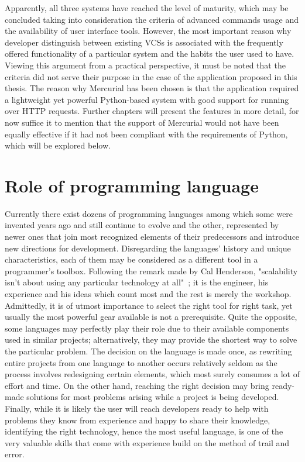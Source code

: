 Apparently, all three systems have reached the level of maturity, which may be concluded taking into consideration the criteria of advanced commands usage and the availability of user interface tools. However, the most important reason why developer distinguish between existing VCSs is associated with the frequently offered functionality of a particular system and the habits the user used to have. Viewing this argument from a practical perspective, it must be noted that the criteria did not serve their purpose in the case of the application proposed in this thesis. The reason why Mercurial has been chosen is that the application required a lightweight yet powerful Python-based system with good support for running over HTTP requests. Further chapters will present the features in more detail, for now suffice it to mention that the support of Mercurial would not have been equally effective if it had not been compliant with the requirements of Python, which will be explored below.

\section{Role of programming language}\label{sec:languages}
Currently there exist dozens of programming languages among which some were invented years ago and still continue to evolve and the other, represented by newer ones that join most recognized elements of their predecessors and introduce new directions for development. Disregarding the languages' history and unique characteristics, each of them may be considered as a different tool in a programmer's toolbox. Following the remark made by Cal Henderson, "scalability isn't about using any particular technology at all"~\cite[page 203]{build_scalable}; it is the engineer, his experience and his ideas which count most and the rest is merely the workshop. Admittedly, it is of utmost importance to select the right tool for right task, yet usually the most powerful gear available is not a prerequisite. Quite the opposite, some languages may perfectly play their role due to their available components used in similar projects; alternatively, they may provide the shortest way to solve the particular problem. The decision on the language is made once, as rewriting entire projects from one language to another occurs relatively seldom as the process involves redesigning certain elements, which most surely consumes a lot of effort and time. On the other hand, reaching the right decision may bring ready-made solutions for most problems arising while a project is being developed. Finally, while it is likely the user will reach developers ready to help with problems they know from experience and happy to share their knowledge, identifying the right technology, hence the most useful language, is one of the very valuable skills that come with experience build on the method of trail and error. 

